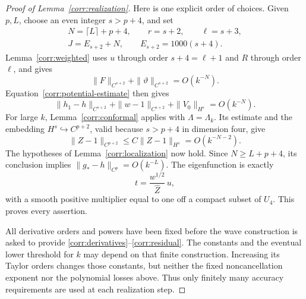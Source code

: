 \begin{proof}[Proof of Lemma~\ref{corr:realization}]
Here is one explicit order of choices.  Given \(p,L\), choose an even
integer \(s>p+4\), and set
\[
 \begin{gathered}
 N=\lceil L\rceil+p+4,\qquad r=s+2,\qquad \ell=s+3,\\
 J=E_{s+2}+N,\qquad E_{s+2}=1000(s+4).
 \end{gathered}
\]
Lemma~\ref{corr:weighted} uses \(u\) through order
\(s+4=\ell+1\) and \(R\) through order \(\ell\), and gives
\[
 \|F\|_{C^{s+2}}+\|\vartheta\|_{C^{s+2}}=O(k^{-N}).
\]
Equation~\eqref{corr:potential-estimate} then gives
\[
 \|h_1-h\|_{C^{s+2}}+\|w-1\|_{C^{s+2}}
                           +\|V_0\|_{H^s}=O(k^{-N}).
\]
For large \(k\), Lemma~\ref{corr:conformal} applies with
\(\Lambda=\Lambda_k\).  Its estimate and the embedding
\(H^s\hookrightarrow C^{p+2}\), valid because \(s>p+4\) in
dimension four, give
\[
 \|Z-1\|_{C^{p+2}}
       \le C\|Z-1\|_{H^s}=O(k^{-N-2}).
\]
The hypotheses of Lemma~\ref{corr:localization} now hold.  Since
\(N\ge L+p+4\), its conclusion implies
\(\|g_*-h\|_{C^p}=O(k^{-L})\).  The eigenfunction is exactly
\[
 t=\frac{w^{1/2}}{\widehat Z}\,u,
\]
with a smooth positive multiplier equal to one off a compact subset
of \(U_4\).  This proves every assertion.

All derivative orders and powers have been fixed before the wave
construction is asked to provide
\eqref{corr:derivatives}--\eqref{corr:residual}.  The constants and
the eventual lower threshold for \(k\) may depend on that finite
construction.  Increasing its Taylor orders changes those constants,
but neither the fixed noncancellation exponent nor the polynomial
losses above.  Thus only finitely many accuracy requirements are used
at each realization step.
\end{proof}
